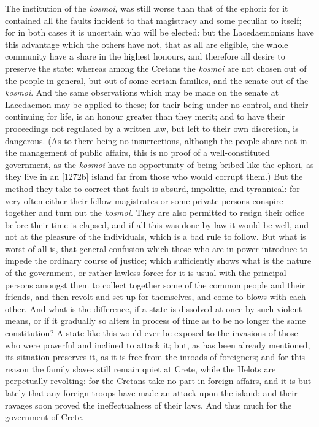 The institution of the \emph{kosmoi}, was still worse than that of the
ephori: for it contained all the faults incident to that magistracy and
some peculiar to itself; for in both cases it is uncertain who will be
elected: but the Lacedaemonians have this advantage which the others have
not, that as all are eligible, the whole community have a share in the
highest honours, and therefore all desire to preserve the state: whereas
among the Cretans the \emph{kosmoi} are not chosen out of the people in
general, but out of some certain families, and the senate out of the \emph{kosmoi}.
And the same observations which may be made on the senate at Lacedaemon
may be applied to these; for their being under no control, and their
continuing for life, is an honour greater than they merit; and to have
their proceedings not regulated by a written law, but left to their own
discretion, is dangerous. (As to there being no insurrections, although
the people share not in the management of public affairs, this is no proof
of a well-constituted government, as the \emph{kosmoi} have no opportunity
of being bribed like the ephori, as they live in an [1272b] island far
from those who would corrupt them.) But the method they take to correct
that fault is absurd, impolitic, and tyrannical: for very often either
their fellow-magistrates or some private persons conspire together and
turn out the \emph{kosmoi}. They are also permitted to resign their office
before their time is elapsed, and if all this was done by law it would be
well, and not at the pleasure of the individuals, which is a bad rule to
follow. But what is worst of all is, that general confusion which those
who are in power introduce to impede the ordinary course of justice; which
sufficiently shows what is the nature of the government, or rather lawless
force: for it is usual with the principal persons amongst them to collect
together some of the common people and their friends, and then revolt and
set up for themselves, and come to blows with each other. And what is the
difference, if a state is dissolved at once by such violent means, or if
it gradually so alters in process of time as to be no longer the same
constitution? A state like this would ever be exposed to the invasions of
those who were powerful and inclined to attack it; but, as has been
already mentioned, its situation preserves it, as it is free from the
inroads of foreigners; and for this reason the family slaves still remain
quiet at Crete, while the Helots are perpetually revolting: for the
Cretans take no part in foreign affairs, and it is but lately that any
foreign troops have made an attack upon the island; and their ravages soon
proved the ineffectualness of their laws. And thus much for the government
of Crete.


